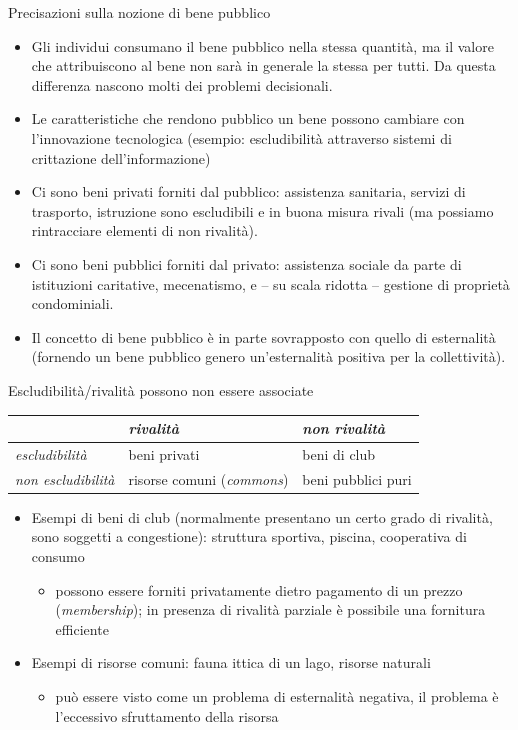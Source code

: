 \documentclass[aspectratio=64,12pt]{beamer}
\begin{document}
\begin{frame}{Precisazioni sulla nozione di bene pubblico}
\begin{itemize}
\item Gli individui consumano il bene pubblico nella stessa quantità, ma il valore che attribuiscono al bene non sarà in generale la stessa per tutti. Da questa differenza nascono molti dei problemi decisionali.
\item Le caratteristiche che rendono pubblico un bene possono cambiare con l'innovazione tecnologica (esempio: escludibilità attraverso sistemi di crittazione dell'informazione)
\item Ci sono beni privati forniti dal pubblico: assistenza sanitaria, servizi di trasporto, istruzione sono escludibili e in buona misura rivali (ma possiamo rintracciare elementi di non rivalità).
\item Ci sono beni pubblici forniti dal privato: assistenza sociale da parte di istituzioni caritative, mecenatismo, e -- su scala ridotta -- gestione di proprietà condominiali.
\item Il concetto di bene pubblico è in parte sovrapposto con quello di esternalità (fornendo un bene pubblico genero un'esternalità positiva per la collettività).
\end{itemize}
\end{frame}


\begin{frame}{Escludibilità/rivalità possono non essere associate}
\begin{center}
\begin{tabular}{lll}
\toprule
 & \emph{rivalità} & \emph{non rivalità}\\[0pt]
\midrule
\emph{escludibilità} & beni privati & beni di club\\[0pt]
\emph{non escludibilità} & risorse comuni (\emph{commons}) & beni pubblici puri\\[0pt]
\bottomrule
\end{tabular}
\end{center}

\begin{itemize}
\item Esempi di beni di club (normalmente presentano un certo grado di rivalità, sono soggetti a congestione): struttura sportiva, piscina, cooperativa di consumo
\begin{itemize}
\item possono essere forniti privatamente dietro pagamento di un prezzo (\emph{membership}); in presenza di rivalità parziale è possibile una fornitura efficiente
\end{itemize}
\item Esempi di risorse comuni: fauna ittica di un lago, risorse naturali
\begin{itemize}
\item può essere visto come un problema di esternalità negativa, il problema è l'eccessivo sfruttamento della risorsa
\end{itemize}
\end{itemize}
\end{frame}
\end{document}
